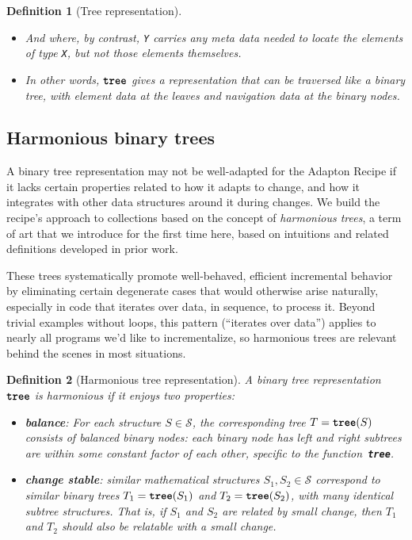 \documentclass[11pt]{article}
\renewcommand{\ottkw}[1]{\textbf{\texttt{#1}}}
\newtheorem{definition}{Definition}
\begin{document}
\begin{appendices}
\begin{definition}[Tree representation]
\begin{itemize}
  \item And where, by contrast, \texttt{Y}
    carries any \emph{meta data} needed to \emph{locate} the elements of type \texttt{X},
    but \emph{not} those elements themselves.

  \item In other words, $\ottkw{tree}$ gives a representation that can
    be traversed like a binary tree, with element data at the leaves
    and navigation data at the binary nodes.
    
  \end{itemize}
\end{definition}

\subsection{Harmonious binary trees}

A binary tree representation may not be well-adapted for the Adapton Recipe if it
lacks certain properties related to how it adapts to change, and
how it integrates with other data structures around it during changes.
%
We build the recipe's approach to collections based on the concept of \emph{harmonious trees},
a term of art that we introduce for the first time here, based on
intuitions and related definitions developed in prior work.

These trees systematically promote well-behaved, efficient incremental
behavior by eliminating certain degenerate cases that would otherwise
arise naturally, especially in code that iterates over data, in
sequence, to process it.
%
Beyond trivial examples without loops, this pattern (``iterates over
data'') applies to nearly all programs we'd like to incrementalize, so
harmonious trees are relevant behind the scenes in most situations.

\begin{definition}[Harmonious tree representation]
  \label{def:harmonious}
  A binary tree representation~$\ottkw{tree}$ is \emph{harmonious} if
  it enjoys two properties:
\begin{itemize}

\item \textbf{balance}: For each structure $S \in \mathcal{S}$, the
  corresponding tree $T = \ottkw{tree}(S)$ consists of \emph{balanced
  binary nodes}: each binary node has left and right subtrees are
  within some constant factor of each other, specific to the function~\ottkw{tree}.

\item \textbf{change stable}: similar mathematical structures $S_1,
  S_2 \in \mathcal{S}$ correspond to similar binary trees $T_1 =
  \ottkw{tree}(S_1)$ and $T_2 = \ottkw{tree}(S_2)$, with many
  identical subtree structures.  That is, if $S_1$ and $S_2$ are
  related by small change, then $T_1$ and $T_2$ should also be
  relatable with a small change.


\end{itemize}
\end{definition}
\end{appendices}
\end{document}
